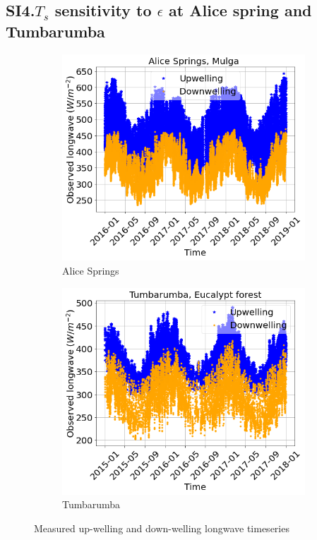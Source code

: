 \documentclass[fleqn,10pt]{wlscirep}
\begin{document}
\subsection*{SI4.$T_{s}$ sensitivity to $\epsilon$ at Alice spring and Tumbarumba}
 \begin{figure}[h!]
\centering
\begin{subfigure}{.5\textwidth}
  \centering
  \includegraphics[width=.95\linewidth]{Alice_spring_longw.png}
  \caption{Alice Springs}
  
\end{subfigure}%
\begin{subfigure}{.5\textwidth}
  \centering
  \includegraphics[width=.95\linewidth]{TUM_longw}
  \caption{Tumbarumba}
\end{subfigure}
\setlength{\belowcaptionskip}{-3ex}
\caption{Measured up-welling and down-welling longwave timeseries}
\label{fig:longwave}
\end{figure}
\end{document}
